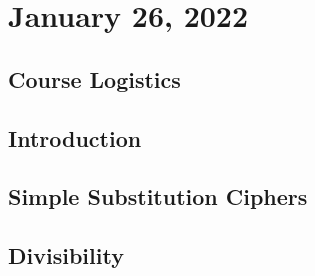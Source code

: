 \setcounter{section}{-1}
\section{January 26, 2022}
\subsection{Course Logistics}

\subsection{Introduction}

\subsection{Simple Substitution Ciphers}

\subsection{Divisibility}